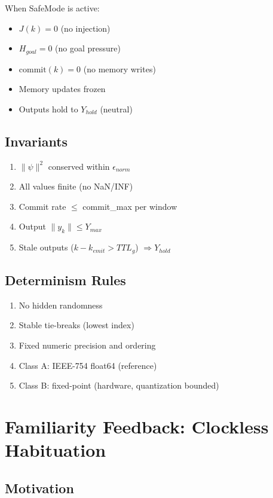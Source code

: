 \documentclass[11pt, a4paper]{report}
\begin{document}
When SafeMode is active:
\begin{itemize}[nosep]
  \item $J(k) = 0$ (no injection)
  \item $H_{goal} = 0$ (no goal pressure)
  \item $\text{commit}(k) = 0$ (no memory writes)
  \item Memory updates frozen
  \item Outputs hold to $Y_{hold}$ (neutral)
\end{itemize}

\section{Invariants}

\begin{enumerate}[nosep]
  \item $\|\psi\|^2$ conserved within $\epsilon_{norm}$
  \item All values finite (no NaN/INF)
  \item Commit rate $\leq$ commit\_max per window
  \item Output $\|y_k\| \leq Y_{max}$
  \item Stale outputs ($k - k_{emit} > TTL_g$) $\Rightarrow Y_{hold}$
\end{enumerate}

\section{Determinism Rules}

\begin{enumerate}[nosep]
  \item No hidden randomness
  \item Stable tie-breaks (lowest index)
  \item Fixed numeric precision and ordering
  \item Class A: IEEE-754 float64 (reference)
  \item Class B: fixed-point (hardware, quantization bounded)
\end{enumerate}

\chapter{Familiarity Feedback: Clockless Habituation}

\section{Motivation}
\end{document}
